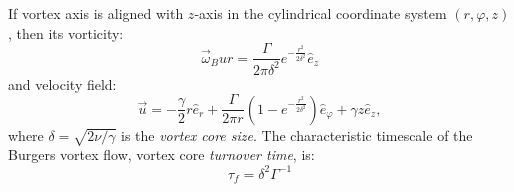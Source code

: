 \documentclass[../main.tex]{subfiles}
\begin{document}
If vortex axis is aligned with $z$-axis in the cylindrical coordinate system $(r, \varphi, z)$, then its vorticity:
\begin{equation}
\vec{\omega}_Bur=\frac{\Gamma}{2 \pi \delta^2} e^{-\frac{r^2}{2 \delta^2}} \hat{e}_z
\label{def:omega_Bur}
\end{equation}
and velocity field:
\begin{equation}
\vec{u}=-\frac{\gamma}{2} r \hat{e}_r+\frac{\Gamma}{2 \pi r} \left(1-e^{-\frac{r^2}{2\delta^2}}\right)\hat{e}_{\varphi}+\gamma z \hat{e}_z,
\label{def_Bur}
\end{equation}
where $\delta=\sqrt{2 \nu / \gamma}$ is the \emph{vortex core size}. The characteristic timescale of the Burgers vortex flow, vortex core \emph{turnover time}, is:
\begin{equation}
\tau_f=\delta^2 \Gamma^{-1}
\label{def:tau_f}
\end{equation}
\end{document}
